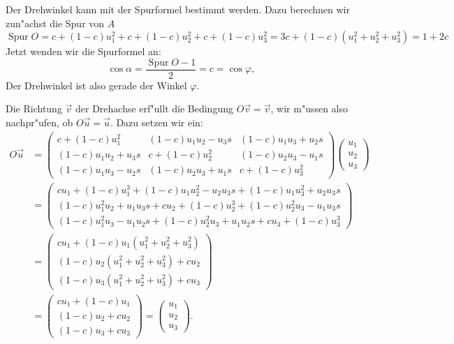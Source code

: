 \begin{loesung}
\begin{teilaufgaben}
\item
Der Drehwinkel kann mit der Spurformel bestimmt werden. Dazu berechnen
wir zun"achst die Spur von $A$
\[
\operatorname{Spur}O=
c+(1-c)u_1^2+c+(1-c)u_2^2+c+(1-c)u_3^2=3c+(1-c)(u_1^2+u_2^2+u_3^2)=1+2c
\]
Jetzt wenden wir die Spurformel an:
\[
\cos\alpha=\frac{\operatorname{Spur}O-1}2=c=\cos\varphi,
\]
Der Drehwinkel ist also gerade der Winkel $\varphi.$
\item
Die Richtung $\vec v$ der Drehachse erf"ullt die Bedingung $O\vec v=\vec v$,
wir m"ussen also nachpr"ufen, ob $O\vec u=\vec u$.
Dazu setzen wir ein:
\begin{align*}
O\vec u
&=
\begin{pmatrix}
c+(1-c)u_1^2    &(1-c)u_1u_2-u_3s   &(1-c)u_1u_3+u_2s\\
(1-c)u_1u_2+u_3s&c+(1-c)u_2^2       &(1-c)u_2u_3-u_1s\\
(1-c)u_1u_3-u_2s&(1-c)u_2u_3+u_1s   &c+(1-c)u_3^2
\end{pmatrix}
\begin{pmatrix}u_1\\u_2\\u_3\end{pmatrix}
\\
&=
\begin{pmatrix}
cu_1+(1-c)u_1^3 +(1-c)u_1u_2^2-u_2u_3s+(1-c)u_1u_3^2+u_2u_3s\\
(1-c)u_1^2u_2+u_1u_3s+cu_2+(1-c)u_2^3+(1-c)u_2^2u_3-u_1u_3s\\
(1-c)u_1^2u_3-u_1u_2s+(1-c)u_2^2u_3+u_1u_2s+cu_3+(1-c)u_3^3
\end{pmatrix}
\\
&=
\begin{pmatrix}
cu_1+(1-c)u_1(u_1^2+u_2^2+u_3^2)\\
(1-c)u_2(u_1^2+u_2^2+u_3^2)+cu_2\\
(1-c)u_3(u_1^2+u_2^2+u_3^2)+cu_3
\end{pmatrix}
\\
&=
\begin{pmatrix}
cu_1+(1-c)u_1\\
(1-c)u_2+cu_2\\
(1-c)u_3+cu_3
\end{pmatrix}
=\begin{pmatrix}u_1\\u_2\\u_3\end{pmatrix}.
\end{align*}
\end{teilaufgaben}
\end{loesung}

